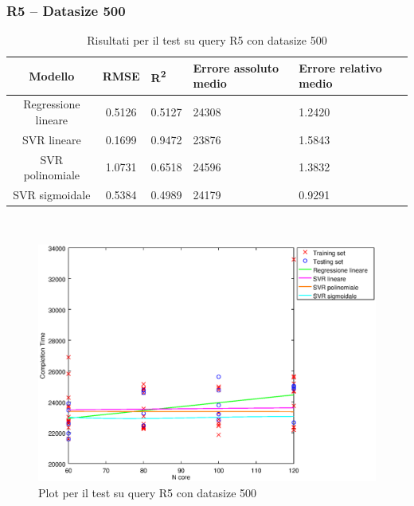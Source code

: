 \documentclass[a4paper,11pt]{article}
\begin{document}
\subsubsection{R5 -- Datasize 500}
\begin{table}[bhpt]
	\centering
	\begin{adjustbox}{center}
		\begin{tabular}{c | c M{1.2cm} M{2.5cm} M{2.5cm} M{1.8cm}}
			Modello & RMSE & R\textsuperscript{2} & Errore assoluto medio & Errore relativo medio \tabularnewline
			\hline
			Regressione lineare & 0.5126 & 0.5127 &  24308 & 1.2420 \\
			SVR lineare & 0.1699 & 0.9472 &  23876 & 1.5843 \\
			SVR polinomiale & 1.0731 & 0.6518 &  24596 & 1.3832 \\
			SVR sigmoidale & 0.5384 & 0.4989 &  24179 & 0.9291 \\
		\end{tabular}
	\end{adjustbox}
	\\
	\caption{Risultati per il test su query R5 con datasize 500}
	\label{table_R5_500}
\end{table}

\begin {figure}[hbtp]
\centering
\includegraphics[width=\textwidth]{output/R5_500/plot_R5_500.eps}
\caption {Plot per il test su query R5 con datasize 500}
\end {figure}
\newpage
\end{document}
